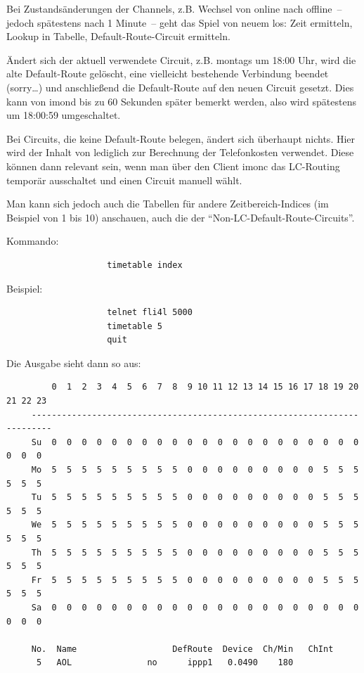   Bei Zustandsänderungen der Channels, z.B. Wechsel von online
  nach offline~-- jedoch spätestens nach 1 Minute~-- geht das Spiel von
  neuem los: Zeit ermitteln, Lookup in Tabelle, Default-Route-Circuit
  ermitteln.

  Ändert sich der aktuell verwendete Circuit, z.B. montags um 18:00
  Uhr, wird die alte Default-Route gelöscht, eine vielleicht
  bestehende Verbindung beendet (sorry\ldots) und anschließend die
  Default-Route auf den neuen Circuit gesetzt. Dies kann von imond bis
  zu 60 Sekunden später bemerkt werden, also wird spätestens um
  18:00:59 umgeschaltet.

  Bei Circuits, die keine Default-Route belegen, ändert sich überhaupt
  nichts. Hier wird der Inhalt von  lediglich zur
  Berechnung der Telefonkosten verwendet. Diese können dann relevant
  sein, wenn man über den Client imonc das LC-Routing temporär
  ausschaltet und einen Circuit manuell wählt.

  Man kann sich jedoch auch die Tabellen für andere
  Zeitbereich-Indices (im Beispiel von 1 bis 10) anschauen, auch die
  der ``Non-LC-Default-Route-Circuits''.

  Kommando:

\begin{example}
\begin{verbatim}
                    timetable index
\end{verbatim}
\end{example}

  Beispiel:

\begin{example}
\begin{verbatim}
                    telnet fli4l 5000
                    timetable 5
                    quit
\end{verbatim}
\end{example}

  Die Ausgabe sieht dann so aus:

\begin{example}
\begin{verbatim}
         0  1  2  3  4  5  6  7  8  9 10 11 12 13 14 15 16 17 18 19 20 21 22 23
     --------------------------------------------------------------------------
     Su  0  0  0  0  0  0  0  0  0  0  0  0  0  0  0  0  0  0  0  0  0  0  0  0
     Mo  5  5  5  5  5  5  5  5  5  0  0  0  0  0  0  0  0  0  5  5  5  5  5  5
     Tu  5  5  5  5  5  5  5  5  5  0  0  0  0  0  0  0  0  0  5  5  5  5  5  5
     We  5  5  5  5  5  5  5  5  5  0  0  0  0  0  0  0  0  0  5  5  5  5  5  5
     Th  5  5  5  5  5  5  5  5  5  0  0  0  0  0  0  0  0  0  5  5  5  5  5  5
     Fr  5  5  5  5  5  5  5  5  5  0  0  0  0  0  0  0  0  0  5  5  5  5  5  5
     Sa  0  0  0  0  0  0  0  0  0  0  0  0  0  0  0  0  0  0  0  0  0  0  0  0

     No.  Name                   DefRoute  Device  Ch/Min   ChInt
      5   AOL               no      ippp1   0.0490    180
\end{verbatim}
\end{example}


